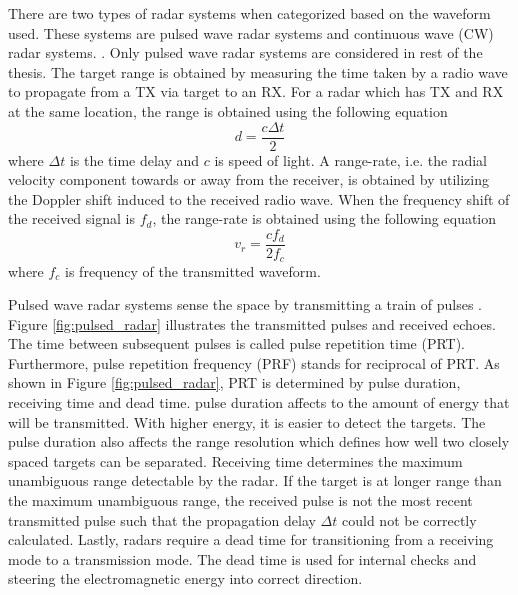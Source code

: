 \documentclass[english, 12pt, a4paper, elec, utf8, a-1b, online]{aaltothesis}
\newcommand{\dt}{\Delta t}
\begin{document}
There are two types of radar systems when categorized based on the waveform used.
These systems are pulsed wave radar systems and continuous wave (CW) radar systems.  \cite{Mahafza2015}.
Only pulsed wave radar systems are considered in rest of the thesis.
The target range is obtained by measuring the time taken by a radio wave to propagate from a TX via target to an RX.
For a radar which has TX and RX at the same location, the range is obtained using the following equation \cite{Curry2011}
\begin{equation}
    d = \frac{ c\dt}{2} 
\end{equation}
where $\dt$ is the time delay and $c$ is speed of light.
A range-rate, i.e. the radial velocity component towards or away from the receiver, is obtained by utilizing the Doppler shift induced to the received radio wave.
When the frequency shift of the received signal is $f_d$, the range-rate is obtained using the following equation \cite{Curry2011}
\begin{equation}
    v_r = \frac{cf_d}{2f_c}
\end{equation}
where $f_c$ is frequency of the transmitted waveform.


Pulsed wave radar systems sense the space by transmitting a train of pulses \cite{Mahafza2015}.
Figure \ref{fig:pulsed_radar} illustrates the transmitted pulses and received echoes.
The time between subsequent pulses is called pulse repetition time (PRT). 
Furthermore, pulse repetition frequency (PRF) stands for reciprocal of PRT.
As shown in Figure \ref{fig:pulsed_radar}, PRT is determined by pulse duration, receiving time and dead time.
pulse duration affects to the amount of energy that will be transmitted.
With higher energy, it is easier to detect the targets.
The pulse duration also affects the range resolution which defines how well two closely spaced targets can be separated.
Receiving time determines the maximum unambiguous range detectable by the radar.
If the target is at longer range than the maximum unambiguous range, the received pulse is not the most recent transmitted pulse such that the propagation delay $\dt$ could not be correctly calculated.
Lastly, radars require a dead time for transitioning from a receiving mode to a transmission mode.
The dead time is used for internal checks and steering the electromagnetic energy into correct direction.
\end{document}
